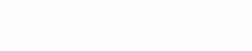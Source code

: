 \documentclass[fontsize=14pt]{scrartcl}
\begin{document}
\thispagestyle{empty}
\vspace*{7.5cm}
\hspace{7cm}
\begin{minipage}[t][7cm][t]{19cm}
\normalfont \bfseries
\textcolor{white}{A Comissão Organizadora certifica que o trabalho intitulado ``varTITULO'', de autoria de varAUTORES foi apresentado na \mbox{XI} \mbox{Escola} de \mbox{Física}, na modalidade varMODALIDADE, realizada de 02 a 05 de julho de 2019 no Instituto do Física da Universidade Federal de Goiás.}
\end{minipage}
\end{document}
